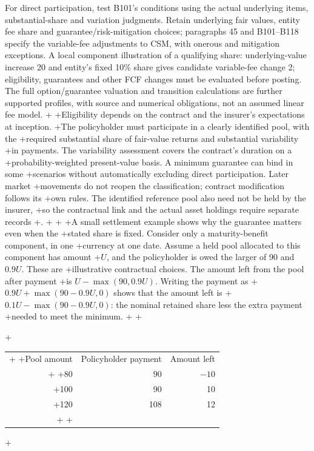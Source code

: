  For direct participation, test B101's conditions using the actual underlying items, substantial-share and variation judgments. Retain underlying fair values, entity fee share and guarantee/risk-mitigation choices; paragraphs 45 and B101--B118 specify the variable-fee adjustments to CSM, with onerous and mitigation exceptions. A local component illustration of a qualifying share: underlying-value increase 20 and entity's fixed 10\% share gives candidate variable-fee change 2; eligibility, guarantees and other FCF changes must be evaluated before posting. The full option/guarantee valuation and transition calculations are further supported profiles, with source and numerical obligations, not an assumed linear fee model.
+
+Eligibility depends on the contract and the insurer's expectations at inception.
+The policyholder must participate in a clearly identified pool, with the
+required substantial share of fair-value returns and substantial variability
+in payments. The variability assessment covers the contract's duration on a
+probability-weighted present-value basis. A minimum guarantee can bind in some
+scenarios without automatically excluding direct participation. Later market
+movements do not reopen the classification; contract modification follows its
+own rules. The identified reference pool also need not be held by the insurer,
+so the contractual link and the actual asset holdings require separate records
+\citep[paragraphs B101--B108 and 72]{aasb17}.
+
+\clearpage
+A small settlement example shows why the guarantee matters even when the
+stated share is fixed. Consider only a maturity-benefit component, in one
+currency at one date. Assume a held pool allocated to this component has amount
+$U$, and the policyholder is owed the larger of 90 and $0.9U$. These are
+illustrative contractual choices. The amount left from the pool after payment
+is $U-\max(90,0.9U)$. Writing the payment as
+$0.9U+\max(90-0.9U,0)$ shows that the amount left is
+$0.1U-\max(90-0.9U,0)$: the nominal retained share less the extra payment
+needed to meet the minimum.
+
+\begin{center}
+\begin{tabular}{@{}rrr@{}}
+\toprule
+Pool amount & Policyholder payment & Amount left\\
+\midrule
+80 & 90 & $-10$\\
+100 & 90 & 10\\
+120 & 108 & 12\\
+\bottomrule
+\end{tabular}
+\end{center}
